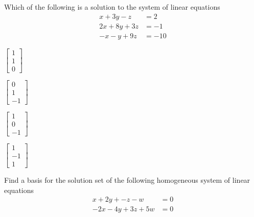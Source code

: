 \documentclass{article}
\begin{document}
\begin{readinessAssuranceTest}
\setcounter{enumi}{30}
\item Which of the following is a solution to the system of linear equations
      \begin{align*}
      x+3y-z    &=   2 \\
      2x+8y+3z  &=  -1 \\
      -x-y+9z   &= -10
      \end{align*}

\begin{multicols}{4}
\begin{readinessAssuranceTestChoices}
\item $\begin{bmatrix} 1 \\ 1 \\ 0 \end{bmatrix}$
\item $\begin{bmatrix} 0 \\ 1 \\ -1 \end{bmatrix}$
\item $\begin{bmatrix} 1 \\ 0 \\ -1 \end{bmatrix}$
\item $\begin{bmatrix} 1 \\ -1 \\ 1 \end{bmatrix}$
\end{readinessAssuranceTestChoices}
\end{multicols}


\item Find a basis for the solution set of the following homogeneous system of
      linear equations
      \begin{align*}
      x+2y+-z-w    &= 0 \\
      -2x-4y+3z+5w &= 0
      \end{align*}


\end{readinessAssuranceTest}
\end{document}

